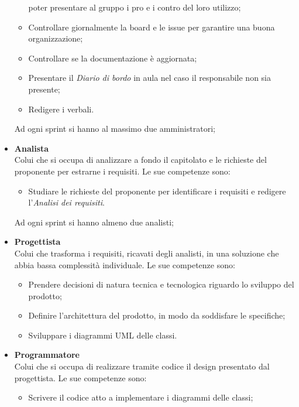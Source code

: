 \begin{itemize}
\begin{itemize}
                    poter presentare al gruppo i pro e i contro del loro utilizzo;
              \item Controllare giornalmente la board e le issue per garantire una buona
                    organizzazione;
              \item Controllare se la documentazione è aggiornata;
              \item Presentare il \textit{Diario di bordo} in aula nel caso il responsabile non sia
                    presente;
              \item Redigere i verbali.
          \end{itemize}
          Ad ogni sprint si hanno al massimo due amministratori;
    \item \textbf{Analista}\\
          Colui che si occupa di analizzare a fondo il capitolato e le richieste del proponente per estrarne i requisiti.
          Le sue competenze sono:
          \begin{itemize}
              \item Studiare le richieste del proponente per identificare i requisiti e redigere
                    l'\textit{Analisi dei requisiti}.
          \end{itemize}
          Ad ogni sprint si hanno almeno due analisti;
    \item \textbf{Progettista}\\
          Colui che trasforma i requisiti, ricavati degli analisti, in una soluzione che abbia bassa complessità individuale.
          Le sue competenze sono:
          \begin{itemize}
              \item Prendere decisioni di natura tecnica e tecnologica riguardo lo sviluppo del
                    prodotto;
              \item Definire l'architettura del prodotto, in modo da soddisfare le specifiche;
              \item Sviluppare i diagrammi UML delle classi.
          \end{itemize}
    \item \textbf{Programmatore}\\
          Colui che si occupa di realizzare tramite codice il design presentato dal progettista.
          Le sue competenze sono:
          \begin{itemize}
              \item Scrivere il codice atto a implementare i diagrammi delle classi;

\end{itemize}
\end{itemize}
